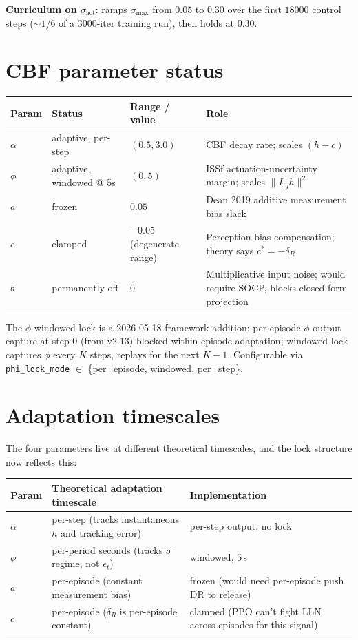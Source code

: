 \documentclass[11pt]{article}
\begin{document}
\textbf{Curriculum on $\sigma_\text{act}$}: ramps $\sigma_\text{max}$ from $0.05$ to $0.30$ over the first $18000$ control steps ($\sim 1/6$ of a 3000-iter training run), then holds at $0.30$.

\section*{CBF parameter status}

\begin{center}
\begin{tabular}{@{}l l l p{2.0in}@{}}
\toprule
Param & Status & Range / value & Role \\
\midrule
$\alpha$ & adaptive, per-step & $(0.5, 3.0)$ & CBF decay rate; scales $(h - c)$ \\
$\phi$   & adaptive, windowed @ 5s & $(0, 5)$ & ISSf actuation-uncertainty margin; scales $\|L_g h\|^2$ \\
$a$      & frozen      & $0.05$ & Dean 2019 additive measurement bias slack \\
$c$      & clamped     & $-0.05$ (degenerate range) & Perception bias compensation; theory says $c^* = -\delta_R$ \\
$b$      & permanently off & $0$ & Multiplicative input noise; would require SOCP, blocks closed-form projection \\
\bottomrule
\end{tabular}
\end{center}

The $\phi$ windowed lock is a 2026-05-18 framework addition: per-episode $\phi$ output capture at step 0 (from v2.13) blocked within-episode adaptation; windowed lock captures $\phi$ every $K$ steps, replays for the next $K-1$. Configurable via \texttt{phi\_lock\_mode} $\in$ \{per\_episode, windowed, per\_step\}.

\section*{Adaptation timescales}

The four parameters live at different theoretical timescales, and the lock structure now reflects this:

\begin{center}
\begin{tabular}{@{}l l l@{}}
\toprule
Param & Theoretical adaptation timescale & Implementation \\
\midrule
$\alpha$ & per-step (tracks instantaneous $h$ and tracking error) & per-step output, no lock \\
$\phi$   & per-period seconds (tracks $\sigma$ regime, not $\epsilon_t$) & windowed, $5$\,s \\
$a$      & per-episode (constant measurement bias) & frozen (would need per-episode push DR to release) \\
$c$      & per-episode ($\delta_R$ is per-episode constant) & clamped (PPO can't fight LLN across episodes for this signal) \\
\bottomrule
\end{tabular}
\end{center}
\end{document}

